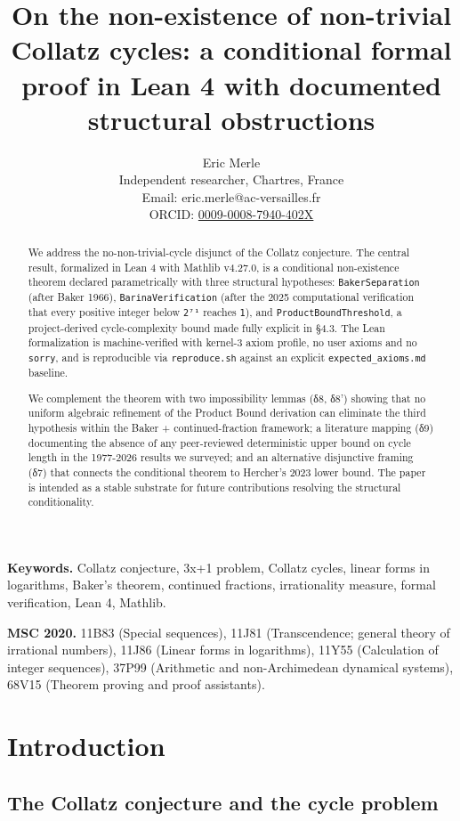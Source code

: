 \documentclass[
  11pt]{amsart}
\title{On the non-existence of non-trivial Collatz cycles: a conditional
formal proof in Lean 4 with documented structural obstructions}
\author{Eric Merle\\
Independent researcher, Chartres, France\\
Email: eric.merle@ac-versailles.fr\\
ORCID:
\href{https://orcid.org/0009-0008-7940-402X}{0009-0008-7940-402X}}
\date{}
\theoremstyle{plain}
\theoremstyle{definition}
\theoremstyle{remark}
\begin{document}
\maketitle
\begin{abstract}
We address the no-non-trivial-cycle disjunct of the Collatz conjecture.
The central result, formalized in Lean 4 with Mathlib v4.27.0, is a
conditional non-existence theorem declared parametrically with three
structural hypotheses: \texttt{BakerSeparation} (after Baker 1966),
\texttt{BarinaVerification} (after the 2025 computational verification
that every positive integer below \texttt{2⁷¹} reaches \texttt{1}), and
\texttt{ProductBoundThreshold}, a project-derived cycle-complexity bound
made fully explicit in §4.3. The Lean formalization is machine-verified
with kernel-3 axiom profile, no user axioms and no \texttt{sorry}, and
is reproducible via \texttt{reproduce.sh} against an explicit
\texttt{expected\_axioms.md} baseline.

We complement the theorem with two impossibility lemmas (δ8, δ8')
showing that no uniform algebraic refinement of the Product Bound
derivation can eliminate the third hypothesis within the Baker +
continued-fraction framework; a literature mapping (δ9) documenting the
absence of any peer-reviewed deterministic upper bound on cycle length
in the 1977-2026 results we surveyed; and an alternative disjunctive
framing (δ7) that connects the conditional theorem to Hercher's 2023
lower bound. The paper is intended as a stable substrate for future
contributions resolving the structural conditionality.
\end{abstract}

\textbf{Keywords.} Collatz conjecture, 3x+1 problem, Collatz cycles,
linear forms in logarithms, Baker's theorem, continued fractions,
irrationality measure, formal verification, Lean 4, Mathlib.

\textbf{MSC 2020.} 11B83 (Special sequences), 11J81 (Transcendence;
general theory of irrational numbers), 11J86 (Linear forms in
logarithms), 11Y55 (Calculation of integer sequences), 37P99 (Arithmetic
and non-Archimedean dynamical systems), 68V15 (Theorem proving and proof
assistants).

\newpage

\section{Introduction}\label{introduction}

\subsection{The Collatz conjecture and the cycle
problem}\label{the-collatz-conjecture-and-the-cycle-problem}
\end{document}
